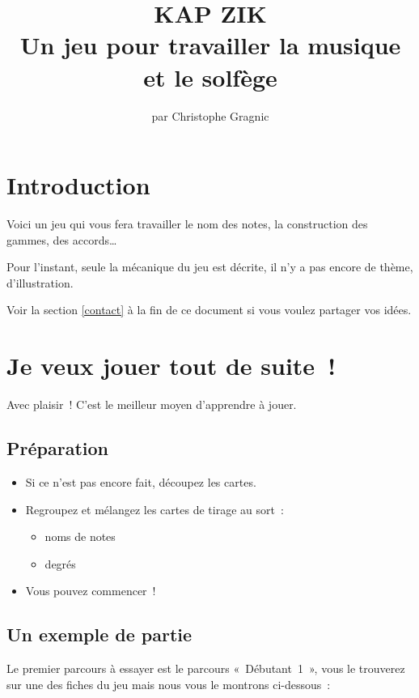 \documentclass[11pt]{article}
\title{\vspace{-5em}
KAP ZIK \\
\vspace{1em}
Un jeu pour travailler la musique et le solfège}
\author{par Christophe Gragnic}
\date{}
\begin{document}
\maketitle

\setcounter{tocdepth}{2}
\tableofcontents

\section{Introduction}

Voici un jeu qui vous fera travailler le nom des notes, la construction des
gammes, des accords…

Pour l’instant, seule la mécanique du jeu est décrite, il n’y a pas encore de
thème, d’illustration.

Voir la section \ref{contact} à la fin de ce document si vous voulez partager
vos idées.

\newpage

\section{Je veux jouer tout de suite !}

Avec plaisir ! C’est le meilleur moyen d’apprendre à jouer.

\subsection{Préparation}

\begin{itemize}
\item Si ce n’est pas encore fait, découpez les cartes.
\item Regroupez et mélangez les cartes de tirage au sort :
    \begin{itemize}
    \item noms de notes
    \item degrés
    \end{itemize}
\item Vous pouvez commencer !
\end{itemize}

\subsection{Un exemple de partie}

Le premier parcours à essayer est le parcours « Débutant 1 », vous le trouverez
sur une des fiches du jeu mais nous vous le montrons ci-dessous :
\end{document}
